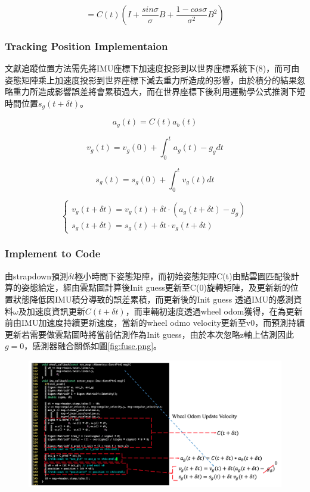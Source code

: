 \documentclass{article}
\begin{document}
\begin{equation}
	=C(t)\left(I + \frac{sin\sigma}{\sigma}B+\frac{1-cos\sigma}{\sigma^2}B^2 \right)
\end{equation}

\subsubsection{Tracking Position Implementaion}
文獻\cite{1}追蹤位置方法需先將IMU座標下加速度投影到以世界座標系統下(8)，而可由姿態矩陣乘上加速度投影到世界座標下減去重力所造成的影響，由於積分的結果忽略重力所造成影響誤差將會累積過大，而在世界座標下後利用運動學公式推測下短時間位置$s_g(t+\delta{t})$。

\begin{equation}
	a_g(t) = C(t)a_b(t)
\end{equation}

\begin{equation}
	v_g(t) = v_g(0) + \int_0^ta_g(t)-g_g dt
\end{equation}

\begin{equation}
 	s_g(t) = s_g(0) + \int_0^tv_g(t)dt
\end{equation}

\begin{equation}
	\begin{cases}
		v_g(t+\delta{t}) = v_g(t) + \delta{t} \cdot (a_g(t+\delta{t})- g_g)\\
		s_g(t+\delta{t}) = s_g(t) + \delta{t} \cdot v_g(t+\delta{t})
	\end{cases}
\end{equation}

\subsubsection{Implement to Code}
由\cite{1}strapdown預測$\delta{t}$極小時間下姿態矩陣，而初始姿態矩陣C(t)由點雲圖匹配後計算的姿態給定，經由雲點圖計算後Init guess更新至C(0)旋轉矩陣，及更新新的位置狀態降低因IMU積分導致的誤差累積，而更新後的Init guess 透過IMU的感測資料$\omega$及加速度資訊更新$C(t+\delta{t})$，而車輛初速度透過wheel odom獲得，在為更新前由IMU加速度持續更新速度，當新的wheel odmo velocity更新至v0，而預測持續更新若需要做雲點圖時將當前估測作為Init guess，由於本次忽略z軸上估測因此$g=0$，感測器融合關係如圖\ref{fig:fuse.png}。
\begin{figure}[H]
\centering
	\includegraphics[width=1.0\textwidth]{./code.png}
\end{figure}
\end{document}

